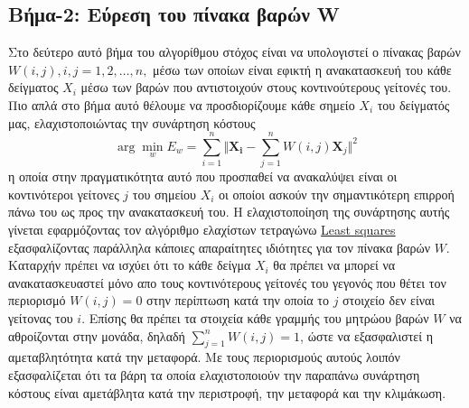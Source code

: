\subsection{Βήμα-2: Εύρεση του πίνακα βαρών \textlatin{W}}
\par
Στο δεύτερο αυτό βήμα του αλγορίθμου στόχος είναι να υπολογιστεί ο πίνακας βαρών $W(i,j),i,j=1,2,\ldots,n,$ μέσω των οποίων είναι εφικτή η ανακατασκευή του κάθε δείγματος $X_{i}$ μέσω των βαρών που αντιστοιχούν στους κοντινούτερους γείτονές του. Πιο απλά στο βήμα αυτό θέλουμε να προσδιορίζουμε κάθε σημείο $X_{i}$ του δείγματός μας, ελαχιστοποιώντας την συνάρτηση κόστους
\newline\hspace*{\fill}
\begin{equation}
        \arg \min_{w} E_{w} = \sum_{i=1}^{n} \Vert \mathbf{X_{i}} - \sum_{j=1}^{n} W(i,j)\mathbf{X}_{j} \Vert ^{2}
\end{equation}
\hspace*{\fill}\newline
η οποία στην πραγματικότητα αυτό που προσπαθεί να ανακαλύψει είναι οι κοντινότεροι γείτονες $j$ του σημείου $X_{i}$ οι οποίοι ασκούν την σημαντικότερη επιρροή πάνω του ως προς την ανακατασκευή του. Η ελαχιστοποίηση της συνάρτησης αυτής γίνεται εφαρμόζοντας τον αλγόριθμο ελαχίστων τετραγώνω \href{https://en.wikipedia.org/wiki/Least_squares}{\textlatin{Least squares}} εξασφαλίζοντας παράλληλα κάποιες απαραίτητες ιδιότητες για τον πίνακα βαρών $W$. Καταρχήν πρέπει να ισχύει ότι το κάθε δείγμα $X_{i}$ θα πρέπει να μπορεί να ανακατασκευαστεί μόνο απο τους κοντινότερους γείτονές του γεγονός που θέτει τον περιορισμό $W(i,j)=0$ στην περίπτωση κατά την οποία το $j$ στοιχείο δεν είναι γείτονας του $i$. Επίσης θα πρέπει τα στοιχεία κάθε γραμμής του μητρώου βαρών $W$ να αθροίζονται στην μονάδα, δηλαδή $\sum_{j=1}^{n} W(i,j)=1$, ώστε να εξασφαλιστεί η αμεταβλητότητα κατά την μεταφορά. Με τους περιορισμούς αυτούς λοιπόν εξασφαλίζεται ότι τα βάρη τα οποία ελαχιστοποιούν την παραπάνω συνάρτηση κόστους είναι αμετάβλητα κατά την περιστροφή, την μεταφορά και την κλιμάκωση.
\par
